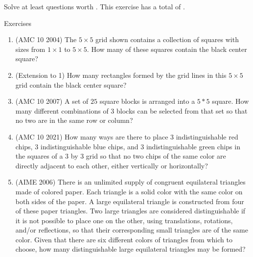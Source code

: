 Solve at least questions worth . This exercise has a total of .
\begin{xcb}{Exercises}
\begin{enumerate}
\item(AMC 10 2004)  The $5\times 5$ grid shown contains a collection of squares with sizes from $1\times 1$ to $5 \times 5$. How many of these squares contain the black center square?
\begin{center}
\end{center}
\begin{hint}
\end{hint}
\item(Extension to 1)  How many rectangles formed by the grid lines in this $5\times 5$ grid contain the black center square?
\item(AMC 10 2007)  A set of $25$ square blocks is arranged into a $5*5$ square. How many different combinations of $3$ blocks can be selected from that set so that no two are in the same row or column?
\item(AMC 10 2021)  How many ways are there to place $3$ indistinguishable red chips, $3$ indistinguishable blue chips, and $3$ indistinguishable green chips in the squares of a $3$ by $3$ grid so that no two chips of the same color are directly adjacent to each other, either vertically or horizontally?
\begin{hint}
\end{hint}
\item (AIME 2006)  There is an unlimited supply of congruent equilateral triangles made of colored paper. Each triangle is a solid color with the same color on both sides of the paper. A large equilateral triangle is constructed from four of these paper triangles. Two large triangles are considered distinguishable if it is not possible to place one on the other, using translations, rotations, and/or reflections, so that their corresponding small triangles are of the same color. Given that there are six different colors of triangles from which to choose, how many distinguishable large equilateral triangles may be formed?

\end{enumerate}
\end{xcb}
